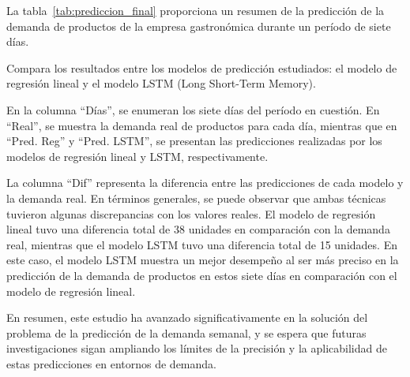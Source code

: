 La tabla~\ref{tab:prediccion_final} proporciona un resumen de la predicción de la demanda de productos de la empresa gastronómica durante un período de siete días. 

\vspace{1\baselineskip}
Compara los resultados entre los modelos de predicción estudiados: el modelo de regresión lineal y el modelo LSTM (Long Short-Term Memory).

\vspace{1\baselineskip}
En la columna  “Días”, se enumeran los siete días del período en cuestión. En  “Real”, se muestra la demanda real de productos para cada día, mientras que en “Pred. Reg” y “Pred. LSTM”, se presentan las predicciones realizadas por los modelos de regresión lineal y LSTM, respectivamente.

\vspace{1\baselineskip}
La columna “Dif” representa la diferencia entre las predicciones de cada modelo y la demanda real. En términos generales, se puede observar que ambas técnicas tuvieron algunas discrepancias con los valores reales. El modelo de regresión lineal tuvo una diferencia total de 38 unidades en comparación con la demanda real, mientras que el modelo LSTM tuvo una diferencia total de 15 unidades. En este caso, el modelo LSTM muestra un mejor desempeño al ser más preciso en la predicción de la demanda de productos en estos siete días en comparación con el modelo de regresión lineal.

\vspace{1\baselineskip}
En resumen, este estudio ha avanzado significativamente en la solución del problema de la predicción de la demanda semanal, y se espera que futuras investigaciones sigan ampliando los límites de la precisión y la aplicabilidad de estas predicciones en entornos de demanda.




